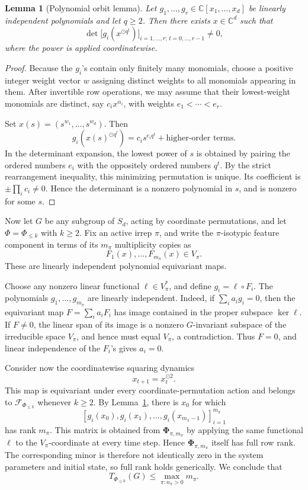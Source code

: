 \documentclass[11pt]{article}
\theoremstyle{plain}
\newtheorem{lemma}[theorem]{Lemma}
\theoremstyle{definition}
\theoremstyle{remark}
\begin{document}
\begin{lemma}[Polynomial orbit lemma]
\label{lem:polynomial_orbit}
Let \(g_1,\ldots,g_r\in\mathbb C[x_1,\ldots,x_d]\) be linearly independent
polynomials and let \(q\ge2\). Then there exists \(x\in\mathbb C^d\) such
that
\[
\det
\bigl[g_i(x^{\odot q^t})\bigr]_
{i=1,\ldots,r;\,t=0,\ldots,r-1}
\ne0,
\]
where the power is applied coordinatewise.
\end{lemma}

\begin{proof}
Because the \(g_i\)'s contain only finitely many monomials, choose a positive
integer weight vector \(w\) assigning distinct weights to all monomials
appearing in them. After invertible row operations, we may assume that their
lowest-weight monomials are distinct, say
\(c_i x^{\alpha_i}\), with weights
\(e_1<\cdots<e_r\).

Set \(x(s)=(s^{w_1},\ldots,s^{w_d})\). Then
\[
g_i(x(s)^{\odot q^t})
=
c_i s^{e_iq^t}
+\text{higher-order terms}.
\]
In the determinant expansion, the lowest power of \(s\) is obtained by
pairing the ordered numbers \(e_i\) with the oppositely ordered numbers
\(q^t\). By the strict rearrangement inequality, this minimizing permutation
is unique. Its coefficient is \(\pm\prod_i c_i\ne0\). Hence the determinant
is a nonzero polynomial in \(s\), and is nonzero for some \(s\).
\end{proof}

Now let \(G\) be any subgroup of \(S_d\), acting by coordinate permutations,
and let \(\Phi=\Phi_{\le k}\) with \(k\ge2\). Fix an active irrep \(\pi\), and
write the \(\pi\)-isotypic feature component in terms of its \(m_\pi\)
multiplicity copies as
\[
F_1(x),\ldots,F_{m_\pi}(x)\in V_\pi.
\]
These are linearly independent polynomial equivariant maps.

Choose any nonzero linear functional \(\ell\in V_\pi^*\), and define
\(g_i=\ell\circ F_i\). The polynomials \(g_1,\ldots,g_{m_\pi}\) are linearly
independent. Indeed, if
\(\sum_i a_i g_i=0\), then the equivariant map
\(F=\sum_i a_iF_i\) has image contained in the proper subspace
\(\ker\ell\). If \(F\ne0\), the linear span of its image is a nonzero
\(G\)-invariant subspace of the irreducible space \(V_\pi\), and hence must
equal \(V_\pi\), a contradiction. Thus \(F=0\), and linear independence of
the \(F_i\)'s gives \(a_i=0\).

Consider now the coordinatewise squaring dynamics
\[
x_{t+1}=x_t^{\odot2}.
\]
This map is equivariant under every coordinate-permutation action and belongs
to \(\mathcal F_{\Phi_{\le k}}\) whenever \(k\ge2\). By
Lemma~\ref{lem:polynomial_orbit}, there is \(x_0\) for which
\[
[g_i(x_0),g_i(x_1),\ldots,g_i(x_{m_\pi-1})]_{i=1}^{m_\pi}
\]
has rank \(m_\pi\). This matrix is obtained from
\(\mathbf{\Phi}_{\pi,m_\pi}\) by applying the same functional \(\ell\) to
the \(V_\pi\)-coordinate at every time step. Hence
\(\mathbf{\Phi}_{\pi,m_\pi}\) itself has full row rank. The corresponding
minor is therefore not identically zero in the system parameters and initial
state, so full rank holds generically. We conclude that
\[
T_{\Phi_{\le k}}(G)
\le
\max_{\pi:n_\pi>0}m_\pi.
\]
\end{document}
